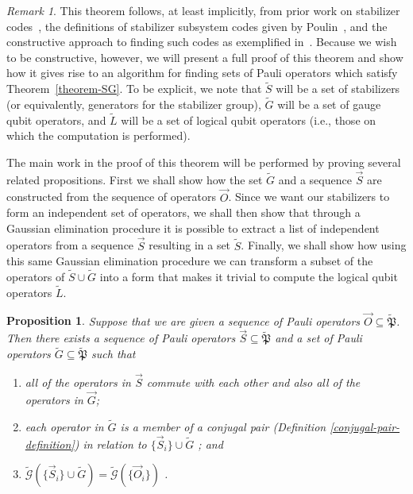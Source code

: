 \documentclass[12pt]{amsbook}
\theoremstyle{plain}
\newtheorem{proposition}{Proposition}
\theoremstyle{definition}
\theoremstyle{remark}
\newtheorem{remark}{Remark}
\newcommand{\lst}{\vec}
\newcommand{\set}{\tilde}
\newcommand{\genfun}{\tilde{\mathcal{G}}}
\newcommand{\pauligroup}{{\set{\mathfrak{P}}}}
\newcommand{\paren}[1]{\left(#1\right)}
\begin{document}
\begin{remark}
This theorem follows, at least implicitly, from prior work on stabilizer codes~\cite{Gottesman:97a}, the definitions of stabilizer subsystem codes given by Poulin~\cite{Poulin:05a}, and the constructive approach to finding such codes as exemplified in~\cite{Bacon:06a}.  Because we wish to be constructive, however, we will present a full proof of this theorem and show how it gives rise to an algorithm for finding sets of Pauli operators which satisfy Theorem~\ref{theorem-SG}.  To be explicit, we note that $\set S$ will be a set of stabilizers (or equivalently, generators for the stabilizer group), $\set G$ will be a set of gauge qubit operators, and $\set L$ will be a set of logical qubit operators (i.e., those on which the computation is performed).

The main work in the proof of this theorem will be performed by proving several related propositions.  First we shall show how the set $\set G$ and a sequence $\lst S$ are constructed from the sequence of operators $\lst O$.  Since we want our stabilizers to form an independent set of operators, we shall then show that through a Gaussian elimination procedure it is possible to extract a list of independent operators from a sequence $\lst S$ resulting in a set $\set S$.  Finally, we shall show how using this same Gaussian elimination procedure we can transform a subset of the operators of $\set S\cup\set G$ into a form that makes it trivial to compute the logical qubit operators $\set L$.
\end{remark}
\begin{proposition} \label{proposition-SG} Suppose that we are given a sequence of Pauli operators $\lst O\subseteq \pauligroup$.  Then there exists a sequence of Pauli operators $\lst S\subseteq\pauligroup$ and a set of Pauli operators $\set G\subseteq\pauligroup$ such that
\begin{enumerate}
\item all of the operators in $\lst S$ commute with each other and also all of the operators in $\lst G$; \label{stabs-commute-with-G}
\item each operator in $\set G$ is a member of a \emph{conjugal pair} (Definition \ref{conjugal-pair-definition}) in relation to $\{\lst S_i\} \cup \set G $ \label{conjugal-pairs-commute-with-SAG}; and
\item $\genfun\paren{\{\lst S_i\}\cup \set G}=\genfun\paren{\{\lst O_i\}}$ \label{SAG-spans-all}.
\end{enumerate}
\end{proposition}
\end{document}
